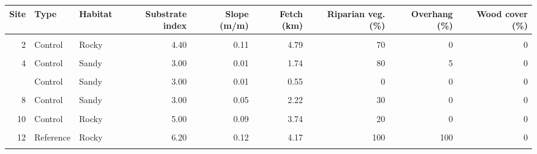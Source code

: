 \documentclass[
  letterpaper,
  DIV=11,
  numbers=noendperiod]{scrartcl}
\begin{document}
\begin{longtable}[t]{rllrrrrrr}
\toprule
Site & Type & Habitat & Substrate index & Slope (m/m) & Fetch (km) & Riparian veg. (\%) & Overhang (\%) & Wood cover (\%)\\
\midrule
\cellcolor{gray!8}{1} & \cellcolor{gray!8}{Stone pile} & \cellcolor{gray!8}{Rocky} & \cellcolor{gray!8}{5.20} & \cellcolor{gray!8}{0.12} & \cellcolor{gray!8}{4.76} & \cellcolor{gray!8}{0} & \cellcolor{gray!8}{10} & \cellcolor{gray!8}{0}\\
2 & Control & Rocky & 4.40 & 0.11 & 4.79 & 70 & 0 & 0\\
\cellcolor{gray!8}{3} & \cellcolor{gray!8}{Stone pile} & \cellcolor{gray!8}{Sandy} & \cellcolor{gray!8}{3.00} & \cellcolor{gray!8}{0.01} & \cellcolor{gray!8}{1.71} & \cellcolor{gray!8}{100} & \cellcolor{gray!8}{0} & \cellcolor{gray!8}{0}\\
4 & Control & Sandy & 3.00 & 0.01 & 1.74 & 80 & 5 & 0\\
\cellcolor{gray!8}{5} & \cellcolor{gray!8}{Stone pile} & \cellcolor{gray!8}{Sandy} & \cellcolor{gray!8}{2.40} & \cellcolor{gray!8}{0.01} & \cellcolor{gray!8}{0.61} & \cellcolor{gray!8}{10} & \cellcolor{gray!8}{0} & \cellcolor{gray!8}{0}\\
\addlinespace
6 & Control & Sandy & 3.00 & 0.01 & 0.55 & 0 & 0 & 0\\
\cellcolor{gray!8}{7} & \cellcolor{gray!8}{Stone pile} & \cellcolor{gray!8}{Sandy} & \cellcolor{gray!8}{3.00} & \cellcolor{gray!8}{0.06} & \cellcolor{gray!8}{2.50} & \cellcolor{gray!8}{100} & \cellcolor{gray!8}{0} & \cellcolor{gray!8}{0}\\
8 & Control & Sandy & 3.00 & 0.05 & 2.22 & 30 & 0 & 0\\
\cellcolor{gray!8}{9} & \cellcolor{gray!8}{Stone pile} & \cellcolor{gray!8}{Sandy} & \cellcolor{gray!8}{3.35} & \cellcolor{gray!8}{0.08} & \cellcolor{gray!8}{3.59} & \cellcolor{gray!8}{0} & \cellcolor{gray!8}{0} & \cellcolor{gray!8}{3}\\
10 & Control & Rocky & 5.00 & 0.09 & 3.74 & 20 & 0 & 0\\
\addlinespace
\cellcolor{gray!8}{11} & \cellcolor{gray!8}{Reference} & \cellcolor{gray!8}{Rocky} & \cellcolor{gray!8}{6.60} & \cellcolor{gray!8}{0.16} & \cellcolor{gray!8}{4.47} & \cellcolor{gray!8}{0} & \cellcolor{gray!8}{0} & \cellcolor{gray!8}{0}\\
12 & Reference & Rocky & 6.20 & 0.12 & 4.17 & 100 & 100 & 0\\
\cellcolor{gray!8}{13} & \cellcolor{gray!8}{Reference} & \cellcolor{gray!8}{Sandy} & \cellcolor{gray!8}{3.60} & \cellcolor{gray!8}{0.09} & \cellcolor{gray!8}{1.71} & \cellcolor{gray!8}{100} & \cellcolor{gray!8}{100} & \cellcolor{gray!8}{0}\\

\end{longtable}
\end{document}
